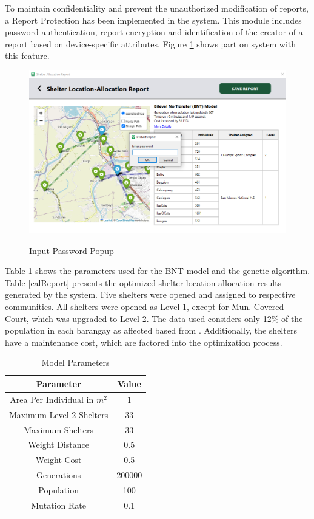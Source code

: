 \documentclass[12pt,a4paper,]{article}
\begin{document}
	To maintain confidentiality and prevent the unauthorized modification of reports, a Report Protection has been implemented in the system. This module includes password authentication, report encryption and identification of the creator of a report based on device-specific attributes. Figure \ref{passPop} shows part on system with this feature.
	
	\begin{figure}[h!]
		\caption{Input Password Popup}
		\centering
		\includegraphics[width=\columnwidth]{Chapter 4/alloc report pass}
		\label{passPop}
	\end{figure}
	
	
	Table \ref{modelParams} shows the parameters used for the BNT model and the genetic algorithm. Table \ref{calReport} presents the optimized shelter location-allocation results generated by the system. Five shelters were opened and assigned to respective communities. All shelters were opened as Level 1, except for Mun. Covered Court, which was upgraded to Level 2. The data used considers only 12\% of the population in each barangay as affected based from \textcite{Opdyke2024}. Additionally, the shelters have a maintenance cost, which are factored into the optimization process.
	
	\begin{table}[h]
		\centering
		\caption{Model Parameters}
		\label{modelParams}
		\begin{tabular}{|c|c|}
			\hline
			\textbf{Parameter} & \textbf{Value} \\ \hline
			Area Per Individual in $m^2$ & 1 \\ 
			Maximum Level 2 Shelters  & 33 \\ 
			Maximum Shelters & 33 \\ 
			Weight Distance & 0.5 \\ 
			Weight Cost & 0.5 \\ 
			Generations & 200000 \\ 
			Population & 100 \\ 
			Mutation Rate & 0.1 \\ \hline
		\end{tabular}
	\end{table}
	
\end{document}
